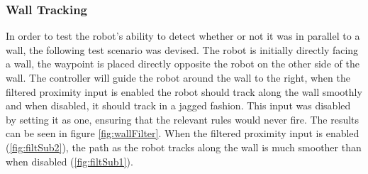 \documentclass[10pt]{article}
\begin{document}
\subsubsection{Wall Tracking}
In order to test the robot's ability to detect whether or not it was in parallel to a wall, the following test scenario was devised.
The robot is initially directly facing a wall, the waypoint is placed directly opposite the robot on the other side of the wall.
The controller will guide the robot around the wall to the right, when the filtered proximity input is enabled the robot should track along the wall smoothly and when disabled, it should track in a jagged fashion.
This input was disabled by setting it as one, ensuring that the relevant rules would never fire. 
The results can be seen in figure \ref{fig:wallFilter}.
When the filtered proximity input is enabled (\ref{fig:filtSub2}), the path as the robot tracks along the wall is much smoother than when disabled (\ref{fig:filtSub1}).
\end{document}
